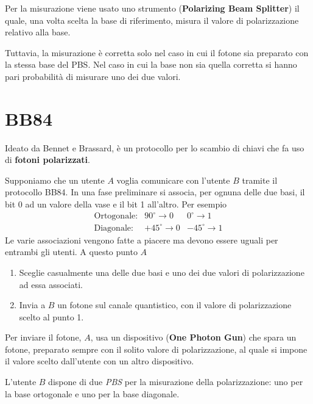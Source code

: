 Per la misurazione viene usato uno strumento (\textbf{Polarizing Beam Splitter}) il quale, una volta scelta la base di
riferimento, misura il valore di polarizzazione relativo alla base.

Tuttavia, la misurazione \`e corretta solo nel caso in cui il fotone sia preparato con la stessa base del PBS. Nel caso
in cui la base non sia quella corretta si hanno pari probabilit\`a di misurare uno dei due valori.

\section{BB84}
Ideato da Bennet e Brassard, \`e un protocollo per lo scambio di chiavi che fa uso di \textbf{fotoni polarizzati}.

Supponiamo che un utente $A$ voglia comunicare con l'utente $B$ tramite il protocollo BB84. In una fase preliminare si
associa, per ognuna delle due basi, il bit 0 ad un valore della vase e il bit 1 all'altro. Per esempio
\[
	\begin{array}{lrr}
		\text{Ortogonale:} & 90^\circ  \rightarrow 0 & 0^\circ   \rightarrow 1 \\
		\text{Diagonale:}  & +45^\circ \rightarrow 0 & -45^\circ \rightarrow 1
	\end{array}
\]
Le varie associazioni vengono fatte a piacere ma devono essere uguali per entrambi gli utenti. A questo punto $A$
\begin{enumerate}
	\item Sceglie casualmente una delle due basi e uno dei due valori di polarizzazione ad essa associati.
	\item Invia a $B$ un fotone sul canale quantistico, con il valore di polarizzazione scelto al punto 1.
\end{enumerate}
Per inviare il fotone, $A$, usa un dispositivo (\textbf{One Photon Gun}) che spara un fotone, preparato sempre con il
solito valore di polarizzazione, al quale si impone il valore scelto dall'utente con un altro dispositivo.

L'utente $B$ dispone di due \emph{PBS} per la misurazione della polarizzazione: uno per la base ortogonale e uno per
la base diagonale.

